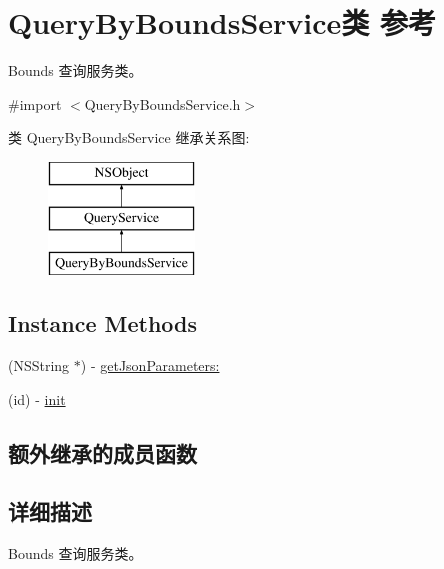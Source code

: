 \hypertarget{interface_query_by_bounds_service}{\section{Query\-By\-Bounds\-Service类 参考}
\label{interface_query_by_bounds_service}
}


Bounds 查询服务类。  




{\ttfamily \#import $<$Query\-By\-Bounds\-Service.\-h$>$}

类 Query\-By\-Bounds\-Service 继承关系图\-:\begin{figure}[H]
\begin{center}
\leavevmode
\includegraphics[height=3.000000cm]{interface_query_by_bounds_service}
\end{center}
\end{figure}
\subsection*{Instance Methods}
\begin{DoxyCompactItemize}
\item 
(N\-S\-String $\ast$) -\/ \hyperlink{interface_query_by_bounds_service_ac4d5fe31a786019c71601e95f5d89b8b}{get\-Json\-Parameters\-:}
\item 
(id) -\/ \hyperlink{interface_query_by_bounds_service_afcfdeda43709e2e71d09724a00e6a8cc}{init}
\end{DoxyCompactItemize}
\subsection*{额外继承的成员函数}


\subsection{详细描述}
Bounds 查询服务类。 

